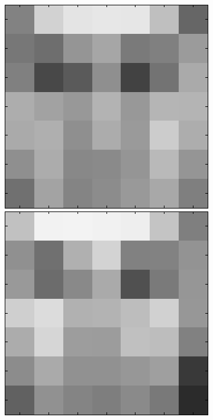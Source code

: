 \begin{figure}[ht]
 \includegraphics[width=\textwidth*11/100]{ch5/figures/XM2VTS_4_2.png}
 \includegraphics[width=\textwidth*11/100]{ch5/figures/XM2VTS_5_2.png}

\end{figure}

